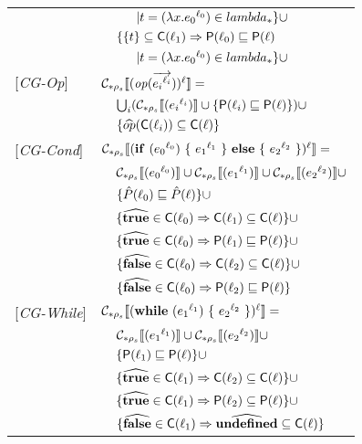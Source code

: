 \begin{tabular}{l l l l}
&&&$| t = (\lambda x.{e_0}^{\ell_0}) \in lambda_* \}\cup$\\
&& \multicolumn{2}{l}{$\{\{ t \} \subseteq \mathsf{C}(\ell_1) \Rightarrow \mathsf{P}(\ell_0) \sqsubseteq \mathsf{P}(\ell)$}\\
&&&$| t = (\lambda x.{e_0}^{\ell_0}) \in lambda_* \}\cup$\\
{[\textit{CG-Op}]}&\multicolumn{3}{l}{$ \mathcal{C}_{*\rho_s}\llbracket (\mathit{op} (\overrightarrow{{e_i}^{\ell_i}}))^\ell \rrbracket = $}\\
&&\multicolumn{2}{l}{$\bigcup_i (\mathcal{C}_{*\rho_s}\llbracket ({e_i}^{\ell_i}) \rrbracket \cup \{ \mathsf{P}(\ell_i) \sqsubseteq \mathsf{P}(\ell) \})\cup$}\\
&&\multicolumn{2}{l}{$\{ \widehat{op} (\mathsf{C}(\ell_i)) \subseteq \mathsf{C}(\ell) \}$}\\
{[\textit{CG-Cond}]}&\multicolumn{3}{l}{$\mathcal{C}_{*\rho_s}\llbracket (\mathbf{if}\ ({e_0}^{\ell_0})\ \{\ {e_1}^{\ell_1}\ \}\ \mathbf{else}\ \{\ {e_2}^{\ell_2}\ \})^\ell \rrbracket = $}\\
&&\multicolumn{2}{l}{$ \mathcal{C}_{*\rho_s}\llbracket ({e_0}^{\ell_0}) \rrbracket \cup \mathcal{C}_{*\rho_s}\llbracket ({e_1}^{\ell_1}) \rrbracket \cup \mathcal{C}_{*\rho_s}\llbracket ({e_2}^{\ell_2}) \rrbracket \cup$}\\
&&\multicolumn{2}{l}{$\{ \hat{P}(\ell_0) \sqsubseteq \hat{P}(\ell) \} \cup$} \\
&&\multicolumn{2}{l}{$\{ \widehat{\mathbf{true}} \in \mathsf{C}(\ell_0) \Rightarrow \mathsf{C}(\ell_1) \subseteq \mathsf{C}(\ell) \}\cup$}\\
&&\multicolumn{2}{l}{$\{ \widehat{\mathbf{true}} \in \mathsf{C}(\ell_0) \Rightarrow \mathsf{P}(\ell_1) \sqsubseteq \mathsf{P}(\ell) \}\cup$} \\
&&\multicolumn{2}{l}{$\{ \widehat{\mathbf{false}} \in \mathsf{C}(\ell_0) \Rightarrow \mathsf{C}(\ell_2) \subseteq \mathsf{C}(\ell) \}\cup$}\\
&&\multicolumn{2}{l}{$\{ \widehat{\mathbf{false}} \in \mathsf{C}(\ell_0) \Rightarrow \mathsf{P}(\ell_2) \sqsubseteq \mathsf{P}(\ell) \}$} \\
{[\textit{CG-While}]}&\multicolumn{3}{l}{$\mathcal{C}_{*\rho_s}\llbracket (\mathbf{while}\ ({e_1}^{\ell_1})\ \{\ {e_2}^{\ell_2}\ \})^\ell \rrbracket = $}\\
&&\multicolumn{2}{l}{$ \mathcal{C}_{*\rho_s}\llbracket ({e_1}^{\ell_1}) \rrbracket \cup \mathcal{C}_{*\rho_s}\llbracket ({e_2}^{\ell_2}) \rrbracket \cup $}\\
&&\multicolumn{2}{l}{$\{ \mathsf{P}(\ell_1) \sqsubseteq \mathsf{P}(\ell) \} \cup$} \\
&&\multicolumn{2}{l}{$\{ \widehat{\mathbf{true}} \in \mathsf{C}(\ell_1) \Rightarrow \mathsf{C}(\ell_2) \subseteq \mathsf{C}(\ell)  \}\cup$}\\
&&\multicolumn{2}{l}{$\{ \widehat{\mathbf{true}} \in \mathsf{C}(\ell_1) \Rightarrow \mathsf{P}(\ell_2) \subseteq \mathsf{P}(\ell)  \}\cup$}\\
&&\multicolumn{2}{l}{$\{ \widehat{\mathbf{false}} \in \mathsf{C}(\ell_1) \Rightarrow \widehat{\mathbf{undefined}} \subseteq \mathsf{C}(\ell) \}$}\\
\end{tabular}
